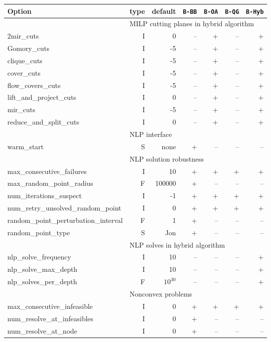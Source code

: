 \begin{center}
\begin{tabular}{|l|r|r|r|r|r|r|}\hline
Option & type &  default & {\tt B-BB} & {\tt B-OA} & {\tt B-QG} & {\tt B-Hyb} \\
\hline
\hline
\multicolumn{1}{|c}{} & \multicolumn{6}{l|}{MILP cutting planes in hybrid algorithm}\\
\hline
2mir\_cuts& I& 0&--& +&--& +\\
Gomory\_cuts& I& -5&--& +&--& +\\
clique\_cuts& I& -5&--& +&--& +\\
cover\_cuts& I& -5&--& +&--& +\\
flow\_covers\_cuts& I& -5&--& +&--& +\\
lift\_and\_project\_cuts& I& 0&--& +&--& +\\
mir\_cuts& I& -5&--& +&--& +\\
reduce\_and\_split\_cuts& I& 0&--& +&--& +\\
\hline
\multicolumn{1}{|c}{} & \multicolumn{6}{l|}{NLP interface}\\
\hline
warm\_start& S& none& +&--&--&--\\
\hline
\multicolumn{1}{|c}{} & \multicolumn{6}{l|}{NLP solution robustness}\\
\hline
max\_consecutive\_failures& I& 10& +& +& +& +\\
max\_random\_point\_radius& F& 100000& +&--&--&--\\
num\_iterations\_suspect& I& -1& +& +& +& +\\
num\_retry\_unsolved\_random\_point& I& 0& +& +& +& +\\
random\_point\_perturbation\_interval& F& 1& +&--&--&--\\
random\_point\_type& S& Jon& +&--&--&--\\
\hline
\multicolumn{1}{|c}{} & \multicolumn{6}{l|}{NLP solves in hybrid algorithm}\\
\hline
nlp\_solve\_frequency& I& 10&--&--&--& +\\
nlp\_solve\_max\_depth& I& 10&--&--&--& +\\
nlp\_solves\_per\_depth& F& $10^{30}$&--&--&--& +\\
\hline
\multicolumn{1}{|c}{} & \multicolumn{6}{l|}{Nonconvex problems}\\
\hline
max\_consecutive\_infeasible& I& 0& +& +& +& +\\
num\_resolve\_at\_infeasibles& I& 0& +&--&--&--\\
num\_resolve\_at\_node& I& 0& +&--&--&--\\

\end{tabular}
\end{center}
